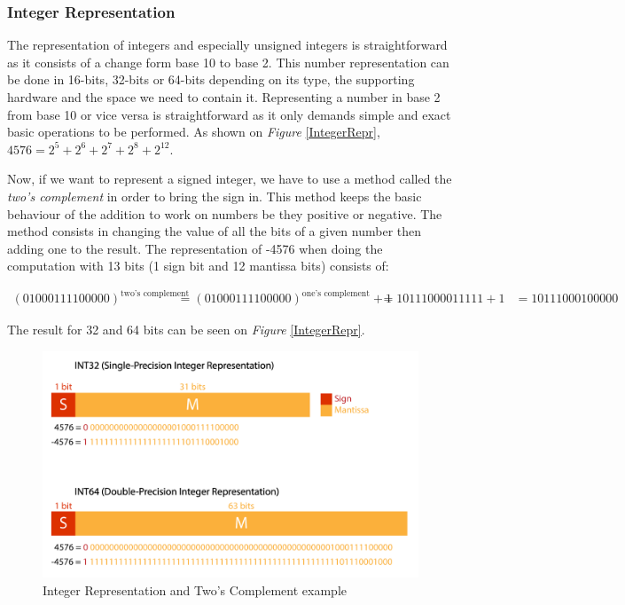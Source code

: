 \subsubsection{Integer Representation}

The representation of integers and especially unsigned integers is straightforward as it consists of a change form base 10 to base 2. This number representation can be done in 16-bits, 32-bits or 64-bits depending on its type, the supporting hardware and the space we need to contain it. Representing a number in base 2 from base 10 or vice versa is straightforward as it only demands simple and exact basic operations to be performed. As shown on \emph{Figure} \ref{IntegerRepr}, $4576 = 2^5 + 2^6 + 2^7 + 2^8 + 2^12$.

Now, if we want to represent a signed integer, we have to use a method called the \emph{two's complement} in order to bring the sign in. This method keeps the basic behaviour of the addition to work on numbers be they positive or negative. The method consists in changing the value of all the bits of a given number then adding one to the result. The representation of -4576 when doing the computation with 13 bits (1 sign bit and 12 mantissa bits) consists of:

\begin{align}
(01000111100000)^\text{two's complement} &= (01000111100000)^\text{one's complement} + 1
                                           &= 10111000011111 + 1
                                           &= 10111000100000
\end{align}

The result for 32 and 64 bits can be seen on \emph{Figure} \ref{IntegerRepr}.

\begin{figure}[htbp]
	\centering
		\includegraphics[width=.8\textwidth]{Figures/IntegerRepr.png}
	\caption[Integer Representation]{Integer Representation and Two's Complement example}
	\label{fig:IntegerRepr}
\end{figure}

